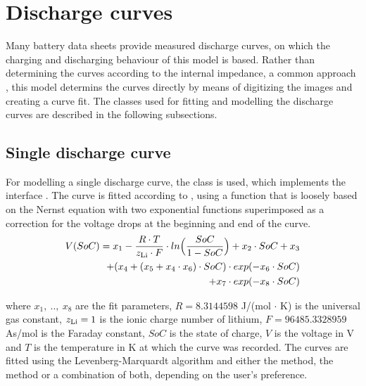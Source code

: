 \section{Discharge curves}
\label{sec:dischargeCurvesMain}
Many battery data sheets provide measured discharge curves, on which the charging and discharging behaviour of this model is based. Rather than determining the curves according to the internal impedance, a common approach \cite{lijun_gao_dynamic_2002}, this model determins the curves directly by means of digitizing the images and creating a curve fit. The classes used for fitting and modelling the discharge curves are described in the following subsections.

\subsection{Single discharge curve}
\label{sec:dischargeFit}
For modelling a single discharge curve, the class  is used, which implements the interface . The curve is fitted according to \cite{werder_entwicklung_2014}, using a function that is loosely based on the Nernst equation with two exponential functions superimposed as a correction for the voltage drops at the beginning and end of the curve.
\begin{equation}
\begin{aligned}
V(SoC) = x_1 - \frac{R\cdot T}{z_\text{Li}\cdot F}\cdot ln\Big(\frac{SoC}{1-SoC}\Big)
+ x_2\cdot SoC + x_3 \\
+ (x_4 + (x_5 + x_4\cdot x_6)\cdot SoC)\cdot exp(-x_6\cdot SoC) \\
+ x_7\cdot exp(-x_8\cdot SoC)
\end{aligned}
\end{equation}

where $x_1,\ ..,\ x_8$ are the fit parameters, $R = 8.3144598$ J/(mol $\cdot$ K) is the universal gas constant, $z_\text{Li} = 1$ is the ionic charge number of lithium, $F = 96485.3328959$ As/mol is the Faraday constant, $SoC$ is the state of charge, $V$ is the voltage in V and $T$ is the temperature in K at which the curve was recorded. The curves are fitted using the Levenberg-Marquardt algorithm and either the  method, the  method or a combination of both, depending on the user's preference. 


